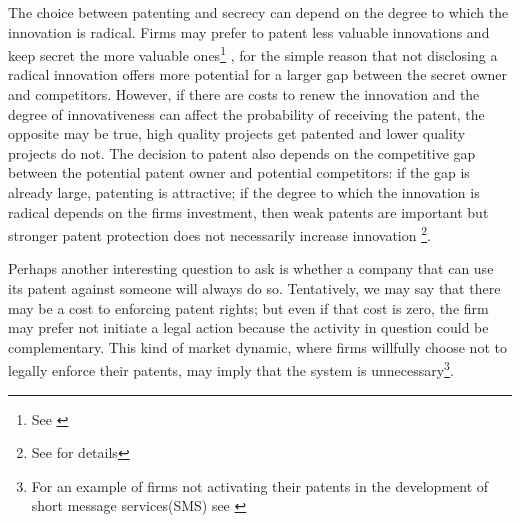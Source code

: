 
The choice between patenting and secrecy can depend on the degree to which the innovation is radical. Firms may prefer to patent less valuable innovations and keep secret the more valuable ones\footnote{See \cite{Anton2004}} , for the simple reason that not disclosing a radical innovation offers more potential for a larger gap between the secret owner and competitors. However, if there are costs to renew the innovation and the degree of innovativeness can affect the probability of receiving the patent, the opposite may be true, high quality projects get patented and lower quality projects do not\citep{Mose2011}. The decision to patent also depends on the competitive gap between the potential patent owner and potential competitors: if the gap is already large, patenting is attractive; if the degree to which the innovation is radical depends on the firms investment, then weak patents are important but stronger patent protection does not necessarily increase innovation \footnote{See \cite{Kultti2006} for details}. %

Perhaps another interesting question to ask is whether a company that can use its patent against someone will always do so. Tentatively, we may say that there may be a cost to enforcing patent rights; but even if that cost is zero, the firm may prefer not initiate a legal action because the activity in question could be complementary. This kind of market dynamic, where firms willfully choose not to legally enforce their patents, may imply that the system is unnecessary\footnote{For an example of firms not activating their patents in the development of short message services(SMS) see \cite{corrocher2013development}}.

